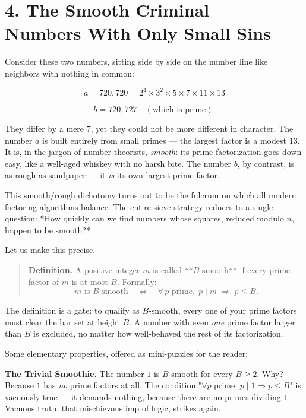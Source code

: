 \documentclass[12pt, letterpaper, openany]{book}
\theoremstyle{definition}
\theoremstyle{remark}
\begin{document}
\section*{4. The Smooth Criminal --- Numbers With Only Small Sins}


Consider these two numbers, sitting side by side on the number line like neighbors with nothing in common:

\[
a = 720{,}720 = 2^4 \times 3^2 \times 5 \times 7 \times 11 \times 13
\]

\[
b = 720{,}727 \quad (\text{which is prime}).
\]

They differ by a mere $7$, yet they could not be more different in character. The number $a$ is built entirely from small primes --- the largest factor is a modest $13$. It is, in the jargon of number theorists, \textit{smooth}: its prime factorization goes down easy, like a well-aged whiskey with no harsh bite. The number $b$, by contrast, is as rough as sandpaper --- it \textit{is} its own largest prime factor.

This smooth/rough dichotomy turns out to be the fulcrum on which all modern factoring algorithms balance. The entire sieve strategy reduces to a single question: *How quickly can we find numbers whose squares, reduced modulo $n$, happen to be smooth?*

Let us make this precise.


\begin{quote}
\textbf{Definition.} A positive integer $m$ is called **$B$-smooth** if every prime factor of $m$ is at most $B$. Formally:
$$m \text{ is } B\text{-smooth} \quad\Longleftrightarrow\quad \forall\, p \text{ prime},\; p \mid m \;\Rightarrow\; p \leq B.$$
\end{quote}


The definition is a gate: to qualify as $B$-smooth, every one of your prime factors must clear the bar set at height $B$. A number with even \textit{one} prime factor larger than $B$ is excluded, no matter how well-behaved the rest of its factorization.

Some elementary properties, offered as mini-puzzles for the reader:

\textbf{The Trivial Smoothie.} The number $1$ is $B$-smooth for every $B \geq 2$. Why? Because $1$ has \textit{no} prime factors at all. The condition "$\forall p$ prime, $p \mid 1 \Rightarrow p \leq B$" is vacuously true --- it demands nothing, because there are no primes dividing $1$. Vacuous truth, that mischievous imp of logic, strikes again.
\end{document}

